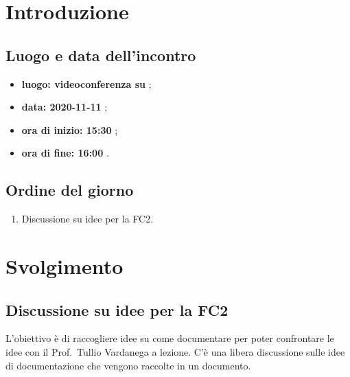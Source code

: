 \section*{Introduzione}
\subsection*{Luogo e data dell'incontro}
\begin{itemize}
	\item \textbf{luogo: videoconferenza su };
	\item \textbf{data: 2020-11-11} ;
	\item \textbf{ora di inizio: 15:30} ;
	\item \textbf{ora di fine: 16:00} .
\end{itemize}

\subsection*{Ordine del giorno}
\begin{enumerate}
	\item Discussione su idee per la FC2. 
\end{enumerate}

\section*{Svolgimento}
\subsection*{Discussione su idee per la FC2}
L'obiettivo è di raccogliere idee su come documentare per poter confrontare le idee con il Prof.~Tullio Vardanega a lezione. C'è una libera discussione sulle idee di documentazione che vengono raccolte in un documento.
